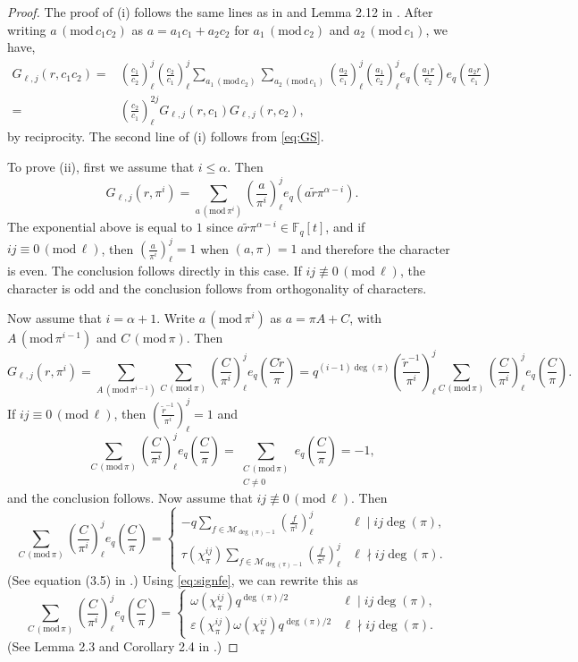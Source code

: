 \documentclass[12pt]{amsart}
\newcommand{\F}{\mathbb{F}}
\renewcommand{\pmod}[1]{\,(\mathrm{mod}\,#1)}
\newcommand{\legl}[2]{\left( \frac{#1}{#2} \right)_\ell}
\begin{document}
\begin{proof} 
The proof of (i) follows the same lines as in  \cite{Florea1} and Lemma 2.12 in \cite{DFL}.
After writing $a \pmod {c_1c_2}$ as $a=a_1 c_1 + a_2 c_2$ for $a_1 \pmod {c_2}$ and $a_2 \pmod {c_1}$, we have,
\begin{align*}
G_{\ell,j}(r, c_1c_2)=&\legl{c_1}{c_2}^j  \legl{c_2}{c_1}^j   \sum_{a_1 \pmod{c_2}}\sum_{a_2 \pmod{c_1}}
\legl{a_2}{c_1}^j \legl{a_1}{c_2}^je_q\left(\frac{a_1r}{c_2}\right)e_q\left(\frac{a_2r}{c_1}\right)\\
=& \legl{c_2}{c_1} ^{2j} G_{\ell,j}(r, c_1)G_{\ell,j}(r, c_2),
\end{align*}
by reciprocity. The second line of (i) follows from \eqref{eq:GS}.


To prove (ii), first we assume that $i \leq \alpha$. Then
$$G_{\ell,j}(r,\pi^i)= \sum_{a \pmod {\pi^i}} \legl{a}{\pi^i}^je_q(a\tilde{r} \pi^{\alpha-i}).$$
The exponential above is equal to $1$ since $a\tilde{r}\pi^{\alpha-i} \in \F_q[t]$, and if $ij \equiv 0 \pmod{\ell}$, then $\legl{a}{\pi^i}^j=1$ when $(a,\pi)=1$ and therefore the character is even. The conclusion  follows directly  in this case. If $ij \not \equiv 0 \pmod \ell$, the character is odd and the conclusion follows from orthogonality of characters.

Now assume that $i = \alpha+1$. Write $a \pmod {\pi^i}$ as $a = \pi A+C$, with $A \pmod {\pi^{i-1}}$ and $C \pmod \pi$. Then
$$G_{\ell,j}(r, \pi^i) = \sum_{A \pmod {\pi^{i-1}}} \sum_{C \pmod \pi} \legl{C}{\pi^i}^j e_q\left( \frac{C\tilde{r}}{\pi} \right )= q^{(i-1)\deg(\pi) } \legl{\tilde{r}^{-1}}{\pi^i}^j \sum_{C \pmod \pi}  \legl{C}{\pi^i}^j e_q\left( \frac{C}{\pi}\right ).$$
If $ij \equiv 0 \pmod \ell$, then $ \legl{\tilde{r}^{-1}}{\pi^i}^j = 1$ and
$$  \sum_{C \pmod \pi}  \legl{C}{\pi^i}^j  e_q\left( \frac{C}{\pi}\right ) = \sum_{\substack{C  \pmod \pi \\ C \neq 0}}  e_q\left( \frac{C}{\pi}\right )  = -1,$$ and the conclusion follows. Now assume that $ij \not \equiv 0 \pmod \ell$.
Then
\[ \sum_{C \pmod \pi} \legl{C}{\pi^i}^j  e_q\left( \frac{C}{\pi}\right ) = \left\{\begin{array}{ll}-q \sum_{f \in \mathcal{M}_{\deg(\pi)-1}} \legl{f}{\pi^i}^j  & \ell\mid ij \deg(\pi), \\
           \tau(\chi_\pi^{ij})\sum_{f \in \mathcal{M}_{\deg(\pi)-1}} \legl{f}{\pi^i}^j  &\ell \nmid ij \deg(\pi).
\end{array} \right. \]
(See equation (3.5) in \cite{Florea1}.) Using \eqref{eq:signfe}, we can rewrite this as
\[\sum_{C \pmod \pi} \legl{C}{\pi^i}^j  e_q\left( \frac{C}{\pi}\right ) = \left\{\begin{array}{ll}\omega(\chi_\pi^{ij})q^{\deg(\pi)/2} & \ell\mid ij\deg(\pi), \\
          \varepsilon(\chi_\pi^{ij}) \omega(\chi_\pi^{ij})q^{\deg(\pi)/2} &\ell \nmid ij\deg(\pi). \end{array} \right.\]
(See Lemma 2.3 and Corollary 2.4 in \cite{DFL}.)



\end{proof}
\end{document}
